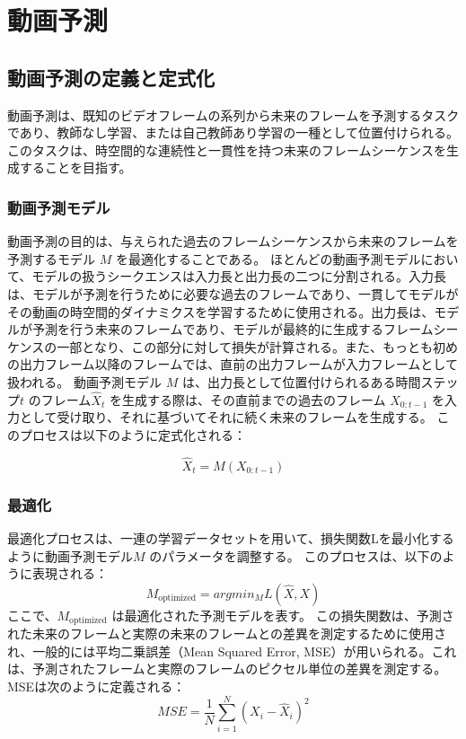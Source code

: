 \chapter{動画予測}

  \section{動画予測の定義と定式化}

    動画予測は、既知のビデオフレームの系列から未来のフレームを予測するタスクであり、教師なし学習、または自己教師あり学習の一種として位置付けられる。
    このタスクは、時空間的な連続性と一貫性を持つ未来のフレームシーケンスを生成することを目指す。

    \subsection{動画予測モデル}
    動画予測の目的は、与えられた過去のフレームシーケンスから未来のフレームを予測するモデル \( M \) を最適化することである。
    ほとんどの動画予測モデルにおいて、モデルの扱うシークエンスは入力長と出力長の二つに分割される。入力長は、モデルが予測を行うために必要な過去のフレームであり、一貫してモデルがその動画の時空間的ダイナミクスを学習するために使用される。出力長は、モデルが予測を行う未来のフレームであり、モデルが最終的に生成するフレームシーケンスの一部となり、この部分に対して損失が計算される。また、もっとも初めの出力フレーム以降のフレームでは、直前の出力フレームが入力フレームとして扱われる。
    動画予測モデル \( M \) は、出力長として位置付けられるある時間ステップ\( t\) のフレーム\( \hat{X}_{t} \) を生成する際は、その直前までの過去のフレーム \( X_{0:t-1} \) を入力として受け取り、それに基づいてそれに続く未来のフレームを生成する。
    このプロセスは以下のように定式化される：

    \begin{equation}
    \hat{X}_{t} = M(X_{0:t-1})
    \end{equation}

    \subsection{最適化}
    最適化プロセスは、一連の学習データセットを用いて、損失関数Lを最小化するように動画予測モデル\( M \) のパラメータを調整する。
    このプロセスは、以下のように表現される：
    \begin{equation}
    M_{\text{optimized}} = argmin_{M} L(\hat{X}, X)
    \end{equation}
    ここで、\( M_{\text{optimized}} \) は最適化された予測モデルを表す。
    この損失関数は、予測された未来のフレームと実際の未来のフレームとの差異を測定するために使用され、一般的には平均二乗誤差（Mean Squared Error, MSE）が用いられる。これは、予測されたフレームと実際のフレームのピクセル単位の差異を測定する。MSEは次のように定義される：
    \begin{equation}
    MSE = \frac{1}{N} \sum_{i=1}^{N} (X_i - \hat{X}_i)^2
    \end{equation}

